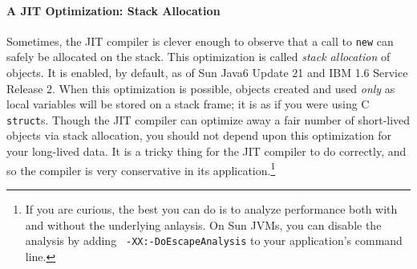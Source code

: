 \paragraph{A JIT Optimization: Stack Allocation}
Sometimes, the JIT compiler is clever enough to observe that a call to {\tt new}
can safely be allocated on the stack. This optimization is called \emph{stack
allocation} of objects. It is enabled, by default, as of
Sun Java6 Update 21 and IBM 1.6 Service Release 2. When this optimization is
possible, objects created and used \emph{only} as local variables will be stored
on a stack frame; it is as if you were using C {\tt struct}s.
Though the JIT compiler can optimize away a fair number of short-lived objects
via stack allocation, you should not depend upon this optimization for your
long-lived data. It is a tricky thing for the JIT compiler to do correctly, and
so the compiler is very conservative in its application.\footnote{If you are
curious, the best you can do is to analyze performance both with and without the
underlying anlaysis. On Sun JVMs, you can disable the analysis by adding {\tt
-XX:-DoEscapeAnalysis} to your application's command line.}




